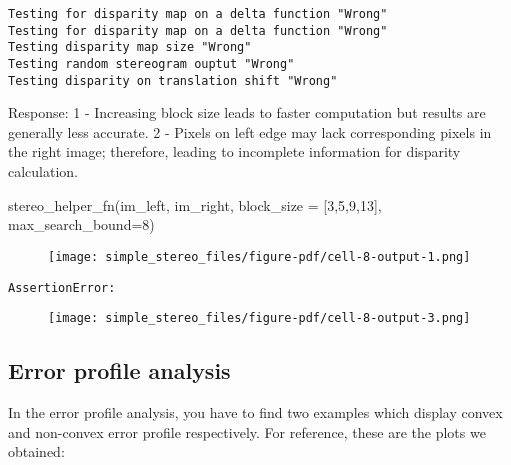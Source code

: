 \documentclass[
  letterpaper,
  DIV=11,
  numbers=noendperiod]{scrartcl}
\newenvironment{Shaded}{\begin{snugshade}}{\end{snugshade}}
\newcommand{\DecValTok}[1]{\textcolor[rgb]{0.68,0.00,0.00}{#1}}
\newcommand{\NormalTok}[1]{\textcolor[rgb]{0.00,0.23,0.31}{#1}}
\newcommand{\OperatorTok}[1]{\textcolor[rgb]{0.37,0.37,0.37}{#1}}
\begin{document}
\begin{verbatim}
Testing for disparity map on a delta function "Wrong"
Testing for disparity map on a delta function "Wrong"
Testing disparity map size "Wrong"
Testing random stereogram ouptut "Wrong"
Testing disparity on translation shift "Wrong"
\end{verbatim}

Response: 1 - Increasing block size leads to faster computation but
results are generally less accurate. 2 - Pixels on left edge may lack
corresponding pixels in the right image; therefore, leading to
incomplete information for disparity calculation.

\begin{Shaded}
\begin{Highlighting}[]
\NormalTok{stereo\_helper\_fn(im\_left, im\_right, block\_size }\OperatorTok{=}\NormalTok{ [}\DecValTok{3}\NormalTok{,}\DecValTok{5}\NormalTok{,}\DecValTok{9}\NormalTok{,}\DecValTok{13}\NormalTok{], max\_search\_bound}\OperatorTok{=}\DecValTok{8}\NormalTok{)}
\end{Highlighting}
\end{Shaded}

\begin{figure}[H]

{\centering \texttt{[image: simple\_stereo\_files/figure-pdf/cell-8-output-1.png]}

}

\end{figure}

\begin{verbatim}
AssertionError: 
\end{verbatim}

\begin{figure}[H]

{\centering \texttt{[image: simple\_stereo\_files/figure-pdf/cell-8-output-3.png]}

}

\end{figure}

\hypertarget{error-profile-analysis}{%
\subsection{Error profile analysis}\label{error-profile-analysis}}

In the error profile analysis, you have to find two examples which
display convex and non-convex error profile respectively. For reference,
these are the plots we obtained:
\end{document}
